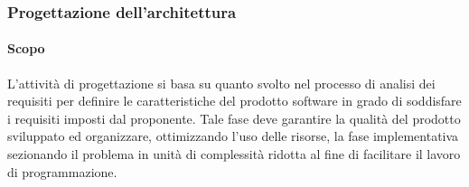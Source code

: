\subsubsection{Progettazione dell'architettura}
\paragraph{Scopo}
L'attività di progettazione si basa su quanto svolto nel processo di analisi dei requisiti per definire le caratteristiche del prodotto software in grado di soddisfare i requisiti imposti dal proponente.  Tale fase deve garantire la qualità del prodotto sviluppato ed organizzare, ottimizzando l'uso delle risorse, la fase implementativa sezionando il problema in unità di complessità ridotta al fine di facilitare il lavoro di programmazione.

